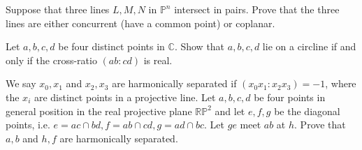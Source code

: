 \documentclass[answers]{exam}
\begin{document}
\begin{questions}
\question%
Suppose that three lines $L, M, N$ in $\mathbb{P}^{n}$ intersect in pairs. Prove that the three lines are either concurrent (have a common point) or coplanar.



\question%



\question%
Let $a, b, c, d$ be four distinct points in $\mathbb{C}$. Show that $a, b, c, d$ lie on a circline if and only if the cross-ratio $(a b: c d)$ is real.



\question%
We say $x_0, x_1$ and $x_2, x_3$ are harmonically separated if $(x_0 x_1: x_2 x_3)=-1$, where the $x_i$ are distinct points in a projective line. Let $a, b, c, d$ be four points in general position in the real projective plane $\mathbb{R} \mathbb{P}^2$ and let $e, f, g$ be the diagonal points, i.e. $e=a c \cap b d, f=a b \cap c d, g=a d \cap b c$. Let $g e$ meet $a b$ at $h$. Prove that $a, b$ and $h, f$ are harmonically separated.



\question%
\end{questions}
\end{document}
